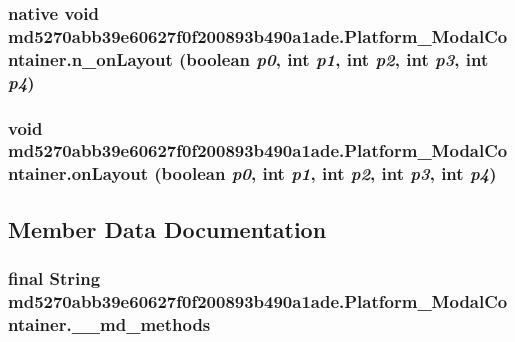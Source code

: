 \hypertarget{classmd5270abb39e60627f0f200893b490a1ade_1_1_platform___modal_container_b786bb28e11cf2bfaeaeaaa0f9eb34cf}{
\subsubsection[{n\_\-onLayout}]{\setlength{\rightskip}{0pt plus 5cm}native void md5270abb39e60627f0f200893b490a1ade.Platform\_\-ModalContainer.n\_\-onLayout (boolean {\em p0}, \/  int {\em p1}, \/  int {\em p2}, \/  int {\em p3}, \/  int {\em p4})}}
\label{classmd5270abb39e60627f0f200893b490a1ade_1_1_platform___modal_container_b786bb28e11cf2bfaeaeaaa0f9eb34cf}


\hypertarget{classmd5270abb39e60627f0f200893b490a1ade_1_1_platform___modal_container_20efd00b191e1b55e8d67cfe214aa46e}{
\subsubsection[{onLayout}]{\setlength{\rightskip}{0pt plus 5cm}void md5270abb39e60627f0f200893b490a1ade.Platform\_\-ModalContainer.onLayout (boolean {\em p0}, \/  int {\em p1}, \/  int {\em p2}, \/  int {\em p3}, \/  int {\em p4})}}
\label{classmd5270abb39e60627f0f200893b490a1ade_1_1_platform___modal_container_20efd00b191e1b55e8d67cfe214aa46e}




\subsection{Member Data Documentation}
\hypertarget{classmd5270abb39e60627f0f200893b490a1ade_1_1_platform___modal_container_43ca49e3a86d594a515e295f1356f624}{
\subsubsection[{\_\-\_\-md\_\-methods}]{\setlength{\rightskip}{0pt plus 5cm}final String {\bf md5270abb39e60627f0f200893b490a1ade.Platform\_\-ModalContainer.\_\-\_\-md\_\-methods}}}
\label{classmd5270abb39e60627f0f200893b490a1ade_1_1_platform___modal_container_43ca49e3a86d594a515e295f1356f624}


